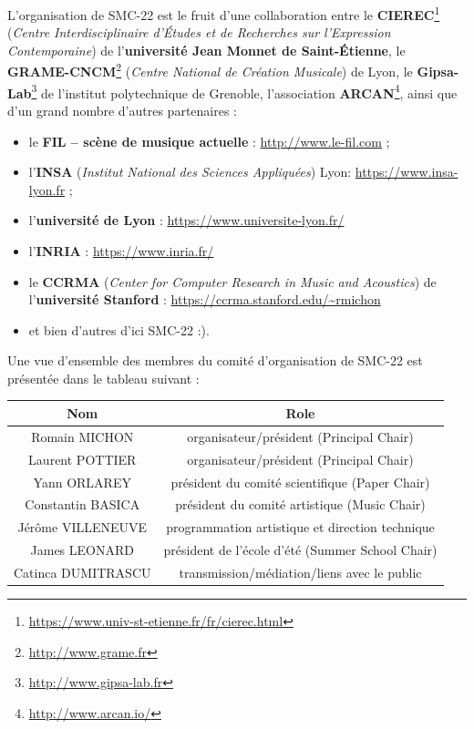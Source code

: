 \documentclass[fontsize=12pt]{scrartcl} %
\numberwithin{equation}{section} %
\numberwithin{table}{section} %
\begin{document}
L'organisation de SMC-22 est le fruit d'une collaboration entre le \textbf{CIEREC}\footnote{\url{https://www.univ-st-etienne.fr/fr/cierec.html}} (\textit{Centre Interdisciplinaire d'Études et de Recherches sur l'Expression Contemporaine}) de l'\textbf{université Jean Monnet de Saint-Étienne}, le \textbf{GRAME-CNCM}\footnote{\url{http://www.grame.fr}} (\textit{Centre National de Création Musicale}) de Lyon, le \textbf{Gipsa-Lab}\footnote{\url{http://www.gipsa-lab.fr}} de l'institut polytechnique de Grenoble, l'association \textbf{ARCAN}\footnote{\url{http://www.arcan.io/}}, ainsi que d'un grand nombre d'autres partenaires :

\begin{itemize}
\item le \textbf{FIL -- scène de musique actuelle} : \url{http://www.le-fil.com} ;
\item l'\textbf{INSA} (\textit{Institut National des Sciences Appliquées}) Lyon: \url{https://www.insa-lyon.fr} ;
\item l'\textbf{université de Lyon} : \url{https://www.universite-lyon.fr/}
\item l'\textbf{INRIA} : \url{https://www.inria.fr/}
\item le \textbf{CCRMA} (\textit{Center for Computer Research in Music and Acoustics}) de l'\textbf{université Stanford} : \url{https://ccrma.stanford.edu/~rmichon}
\item et bien d'autres d'ici SMC-22 :).
\end{itemize}

Une vue d'ensemble des membres du comité d'organisation de SMC-22 est présentée dans le tableau suivant :

\begin{table}[!htbp]
  \begin{center}
    \begin{tabular}{c | c}
      \textbf{Nom} & \textbf{Role} \\
      \hline
      \hline
      Romain MICHON & organisateur/président (Principal Chair) \\
      Laurent POTTIER & organisateur/président (Principal Chair) \\
      Yann ORLAREY & président du comité scientifique (Paper Chair) \\
      Constantin BASICA & président du comité artistique (Music Chair) \\
      Jérôme VILLENEUVE & programmation artistique et direction technique \\
      James LEONARD & président de l'école d'été (Summer School Chair) \\
      Catinca DUMITRASCU & transmission/médiation/liens avec le public \\
    \end{tabular}
  \end{center}
\end{table}
\end{document}
